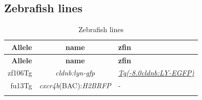 \documentclass[11pt,singlespacinge,twoside]{reedthesis} %
\begin{document}
\hypertarget{mat-lines}{%
\subsection{Zebrafish lines}\label{mat-lines}}
\begin{longtable}[]{@{}rcl@{}}
\caption{\label{tab:mat-lines} Zebrafish lines}\tabularnewline
\toprule
\begin{minipage}[b]{0.12\columnwidth}\raggedleft
\textbf{Allele}\strut
\end{minipage} & \begin{minipage}[b]{0.29\columnwidth}\centering
\textbf{name}\strut
\end{minipage} & \begin{minipage}[b]{0.50\columnwidth}\raggedright
\textbf{zfin}\strut
\end{minipage}\tabularnewline
\midrule
\endfirsthead
\toprule
\begin{minipage}[b]{0.12\columnwidth}\raggedleft
\textbf{Allele}\strut
\end{minipage} & \begin{minipage}[b]{0.29\columnwidth}\centering
\textbf{name}\strut
\end{minipage} & \begin{minipage}[b]{0.50\columnwidth}\raggedright
\textbf{zfin}\strut
\end{minipage}\tabularnewline
\midrule
\endhead
\begin{minipage}[t]{0.12\columnwidth}\raggedleft
zf106Tg\strut
\end{minipage} & \begin{minipage}[t]{0.29\columnwidth}\centering
\emph{cldnb:lyn-gfp}\strut
\end{minipage} & \begin{minipage}[t]{0.50\columnwidth}\raggedright
\href{//zfin.org/ZDB-ALT-060919-2}{\emph{Tg(-8.0cldnb:LY-EGFP)}}\strut
\end{minipage}\tabularnewline
\begin{minipage}[t]{0.12\columnwidth}\raggedleft
fu13Tg\strut
\end{minipage} & \begin{minipage}[t]{0.29\columnwidth}\centering
\emph{cxcr4b}(BAC):\emph{H2BRFP}\strut
\end{minipage} & \begin{minipage}[t]{0.50\columnwidth}\raggedright
-\strut
\end{minipage}\tabularnewline
\begin{minipage}[t]{0.12\columnwidth}\raggedleft

\end{minipage}
\end{longtable}
\end{document}
